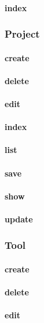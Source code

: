 \documentclass[12pt]{article}
\begin{document}
\paragraph{index}

\subsubsection{Project}\label{sec:CProject}
\paragraph{create}
\paragraph{delete}
\paragraph{edit}
\paragraph{index}
\paragraph{list}
\paragraph{save}
\paragraph{show}
\paragraph{update}

\subsubsection{Tool}\label{sec:CTool}
\paragraph{create}
\paragraph{delete}
\paragraph{edit}
\end{document}
